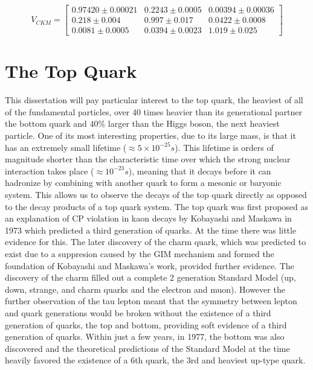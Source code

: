 \[ V_{CKM} =
\begin{bmatrix}
0.97420 \pm 0.00021 & 0.2243 \pm 0.0005 & 0.00394 \pm 0.00036 \\ 
0.218 \pm 0.004 & 0.997 \pm 0.017 & 0.0422 \pm 0.0008 \\
0.0081 \pm 0.0005 & 0.0394 \pm 0.0023 & 1.019 \pm 0.025 
\end{bmatrix}
\]


\section{The Top Quark}

This dissertation will pay particular interest to the top quark, the heaviest of all of the fundamental particles, over 40 times heavier than its generational partner the bottom quark and $40\%$ larger than the Higgs boson, the next heaviest particle.  One of its most interesting properties, due to its large mass, is that it has an extremely small lifetime ($\approx 5 \times 10^{-25} s$).  This lifetime is orders of magnitude shorter than the characteristic time over which the strong nuclear interaction takes place ($\approx 10^{-23}s$), meaning that it decays before it can hadronize by combining with another quark to form a mesonic or baryonic system.  This allows us to observe the decays of the top quark directly as opposed to the decay products of a top quark system.
The top quark was first proposed as an explanation of CP violation in kaon decays by Kobayashi and Maskawa in 1973\cite{CKM2} which predicted a third generation of quarks.  At the time there was little evidence for this.  The later discovery of the charm quark, which was predicted to exist due to a suppresion caused by the GIM mechanism\cite{GIM} and formed the foundation of Kobayashi and Maskawa's work, provided further evidence.  The discovery of the charm filled out a complete 2 generation Standard Model (up, down, strange, and charm quarks and the electron and muon).  However the further observation of the tau lepton meant that the symmetry between lepton and quark generations would be broken without the existence of a third generation of quarks, the top and bottom, providing soft evidence of a third generation of quarks.  Within just a few years, in 1977, the bottom was also discovered\cite{BDiscovery} and the theoretical predictions of the Standard Model at the time heavily favored the existence of a 6th quark, the 3rd and heaviest up-type quark.  

